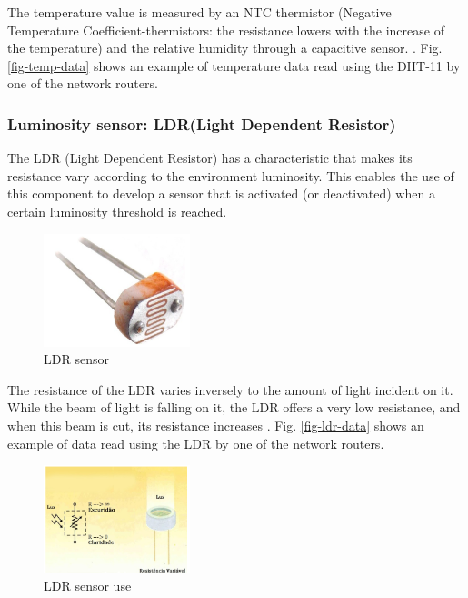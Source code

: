 The temperature value is measured by an NTC thermistor (Negative Temperature Coefficient-thermistors: the resistance lowers with the increase of the temperature) and the relative humidity through a capacitive sensor. \cite{robotics2010dht11}. Fig. \ref{fig-temp-data} shows an example of temperature data read using the DHT-11 by one of the network routers.

\subsubsection{Luminosity sensor: LDR(Light Dependent Resistor)}

The LDR (Light Dependent Resistor) has a characteristic that makes its resistance vary according to the environment luminosity. This enables the use of this component to develop a sensor that is activated (or deactivated) when a certain luminosity threshold is reached.

\begin{figure}[!tb]
\centering
\includegraphics[width=0.38\textwidth]{figs/ldr}
\caption{LDR sensor}
\label{fig-ldr}
\end{figure}

The resistance of the LDR varies inversely to the amount of light incident on it. While the beam of light is falling on it, the LDR offers a very low resistance, and when this beam is cut, its resistance increases \cite{ldr2010manual}. Fig. \ref{fig-ldr-data} shows an example of data read using the LDR by one of the network routers.

\begin{figure}[!tb]
\centering
\includegraphics[width=0.38\textwidth]{figs/ldr-1}
\caption{LDR sensor use}
\label{fig-ldr-1}
\end{figure}


